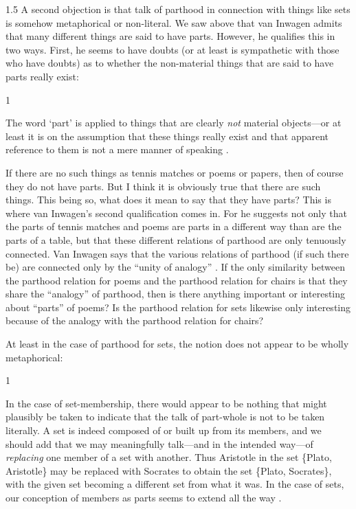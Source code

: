 \documentclass[11pt]{article}
\newenvironment{squote}{%
\begin{spacing}{1}
\begin{list}{}{%
\setlength{\labelwidth}{0pt}%
\rightmargin\leftmargin%
}
\item\relax
}{%
\end{list}%
\end{spacing}
}
\begin{document}
\begin{spacing}{1.5}
A second objection is that talk of parthood in connection with things
like sets is somehow metaphorical or non-literal.  We saw above that
van Inwagen admits that many different things are said to have parts.
However, he qualifies this in two ways.  First, he seems to have
doubts (or at least is sympathetic with those who have doubts) as to
whether the non-material things that are said to have parts really
exist:

\begin{squote}
The word `part' is applied to things that are clearly \emph{not}
material objects---or at least it is on the assumption that these
things really exist and that apparent reference to them is not a mere
manner of speaking \citep[19]{inwagen1995}.
\end{squote}

If there are no such things as tennis matches or poems or papers, then
of course they do not have parts.  But I think it is obviously true
that there are such things.  This being so, what does it mean to say
that they have parts?  This is where van Inwagen's second
qualification comes in.  For he suggests not only that the parts of
tennis matches and poems are parts in a different way than are the
parts of a table, but that these different relations of parthood are
only tenuously connected.  Van Inwagen says that the various relations
of parthood (if such there be) are connected only by the ``unity of
analogy'' \citeyearpar[19]{inwagen1995}.  If the only similarity
between the parthood relation for poems and the parthood relation for
chairs is that they share the ``analogy'' of parthood, then is there
anything important or interesting about ``parts'' of poems?  Is the
parthood relation for sets likewise only interesting because of the
analogy with the parthood relation for chairs?

At least in the case of parthood for sets, the notion does not appear
to be wholly metaphorical:

\begin{squote}
In the case of set-membership, there would appear to be nothing that
might plausibly be taken to indicate that the talk of part-whole is
not to be taken literally. A set is indeed composed of or built up
from its members, and we should add that we may meaningfully
talk---and in the intended way---of \emph{replacing} one member of a
set with another.  Thus Aristotle in the set \{Plato, Aristotle\} may
be replaced with Socrates to obtain the set \{Plato, Socrates\}, with
the given set becoming a different set from what it was. In the case
of sets, our conception of members as parts seems to extend all the
way \citep[564]{fine2010}.
\end{squote}


\end{spacing}
\end{document}
